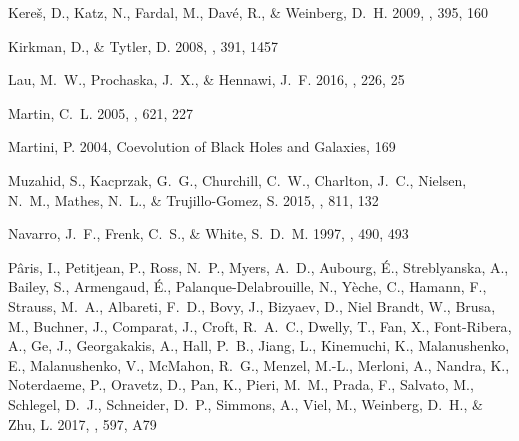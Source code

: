 \documentclass[iop]{emulateapj}
\begin{document}
\begin{thebibliography}{52}
{Kere\v{s}}, D., {Katz}, N., {Fardal}, M., {Dav{\'e}}, R., \& {Weinberg}, D.~H.
  2009, \mnras, 395, 160

{Kirkman}, D., \& {Tytler}, D. 2008, \mnras, 391, 1457

{Lau}, M.~W., {Prochaska}, J.~X., \& {Hennawi}, J.~F. 2016, \apjs, 226, 25

{Martin}, C.~L. 2005, \apj, 621, 227

{Martini}, P. 2004, Coevolution of Black Holes and Galaxies, 169

{Muzahid}, S., {Kacprzak}, G.~G., {Churchill}, C.~W., {Charlton}, J.~C.,
  {Nielsen}, N.~M., {Mathes}, N.~L., \& {Trujillo-Gomez}, S. 2015, \apj, 811,
  132

{Navarro}, J.~F., {Frenk}, C.~S., \& {White}, S.~D.~M. 1997, \apj, 490, 493

{P{\^a}ris}, I., {Petitjean}, P., {Ross}, N.~P., {Myers}, A.~D., {Aubourg},
  {\'E}., {Streblyanska}, A., {Bailey}, S., {Armengaud}, {\'E}.,
  {Palanque-Delabrouille}, N., {Y{\`e}che}, C., {Hamann}, F., {Strauss}, M.~A.,
  {Albareti}, F.~D., {Bovy}, J., {Bizyaev}, D., {Niel Brandt}, W., {Brusa}, M.,
  {Buchner}, J., {Comparat}, J., {Croft}, R.~A.~C., {Dwelly}, T., {Fan}, X.,
  {Font-Ribera}, A., {Ge}, J., {Georgakakis}, A., {Hall}, P.~B., {Jiang}, L.,
  {Kinemuchi}, K., {Malanushenko}, E., {Malanushenko}, V., {McMahon}, R.~G.,
  {Menzel}, M.-L., {Merloni}, A., {Nandra}, K., {Noterdaeme}, P., {Oravetz},
  D., {Pan}, K., {Pieri}, M.~M., {Prada}, F., {Salvato}, M., {Schlegel}, D.~J.,
  {Schneider}, D.~P., {Simmons}, A., {Viel}, M., {Weinberg}, D.~H., \& {Zhu},
  L. 2017, \aap, 597, A79


\end{thebibliography}
\end{document}
